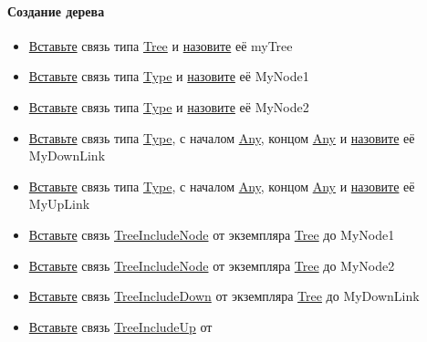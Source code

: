 \paragraph{Создание дерева}
\begin{itemize}
      \item \hyperlink{DeepCase.InsertLink.Description}{Вставьте} связь типа
            \hyperlink{Tree}{Tree} и \hyperlink{FAQ.HowToSetName}{назовите} её
            myTree
      \item \hyperlink{DeepCase.InsertLink.Description}{Вставьте} связь типа
            \hyperlink{Type.Description}{Type} и
            \hyperlink{FAQ.HowToSetName}{назовите} её MyNode1
      \item \hyperlink{DeepCase.InsertLink.Description}{Вставьте} связь типа
            \hyperlink{Type.Description}{Type} и
            \hyperlink{FAQ.HowToSetName}{назовите} её MyNode2
      \item \hyperlink{DeepCase.InsertLink.Description}{Вставьте} связь типа
            \hyperlink{Type.Description}{Type}, с началом
            \hyperlink{Core.Any.Description}{Any}, концом
            \hyperlink{Core.Any.Description}{Any} и
            \hyperlink{FAQ.HowToSetName}{назовите} её
            MyDownLink
      \item \hyperlink{DeepCase.InsertLink.Description}{Вставьте} связь типа
            \hyperlink{Type.Description}{Type}, с началом
            \hyperlink{Core.Any.Description}{Any}, концом
            \hyperlink{Core.Any.Description}{Any} и
            \hyperlink{FAQ.HowToSetName}{назовите} её
            MyUpLink
      \item \hyperlink{DeepCase.InsertLink.Description}{Вставьте} связь
            \hyperlink{Core.TreeIncludeNode.Description}{TreeIncludeNode} от
            экземпляра \hyperlink{Core.Tree.Description}{Tree} до MyNode1
      \item \hyperlink{DeepCase.InsertLink.Description}{Вставьте} связь
            \hyperlink{Core.TreeIncludeNode.Description}{TreeIncludeNode} от
            экземпляра \hyperlink{Core.Tree.Description}{Tree} до MyNode2
      \item \hyperlink{DeepCase.InsertLink.Description}{Вставьте} связь
            \hyperlink{Core.TreeIncludeDown.Description}{TreeIncludeDown} от
            экземпляра \hyperlink{Core.Tree.Description}{Tree} до MyDownLink
      \item \hyperlink{DeepCase.InsertLink.Description}{Вставьте} связь
            \hyperlink{Core.TreeIncludeNode.Description}{TreeIncludeUp} от

\end{itemize}
